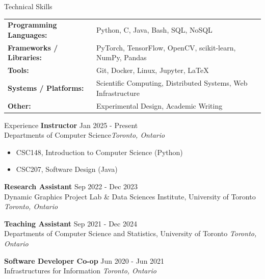 \documentclass{resume} %
\begin{document}
\begin{rSection}{Technical Skills}
\begin{tabular}{ l l }
\textbf{Programming Languages:} & Python, C, Java, Bash, SQL, NoSQL \\
\textbf{Frameworks / Libraries:} & PyTorch, TensorFlow, OpenCV, scikit-learn, NumPy, Pandas \\
\textbf{Tools:} & Git, Docker, Linux, Jupyter, LaTeX \\
\textbf{Systems / Platforms:} & Scientific Computing, Distributed Systems, Web Infrastructure \\
\textbf{Other:} & Experimental Design, Academic Writing
\end{tabular}
\end{rSection}

\begin{rSection}{Experience}
    \textbf{Instructor} \hfill Jan 2025 - Present\\Departments of Computer Science\hfill \textit{Toronto, Ontario}
    \begin{itemize}
        \itemsep -3pt {} 
        \item CSC148, Introduction to Computer Science (Python)
        \item CSC207, Software Design (Java)
    \end{itemize}
    \textbf{Research Assistant} \hfill Sep 2022 - Dec 2023\\Dynamic Graphics Project Lab \& Data Sciences Institute, University of Toronto \hfill \textit{Toronto, Ontario}
    \begin{itemize}
    \end{itemize}


    \textbf{Teaching Assistant} \hfill Sep 2021 - Dec 2024\\Departments of Computer Science and Statistics, University of Toronto \hfill \textit{Toronto, Ontario}
    
    \textbf{Software Developer Co-op} \hfill Jun 2020 - Jun 2021\\Infrastructures for Information \hfill \textit{Toronto, Ontario}

\end{rSection} 
\end{document}
